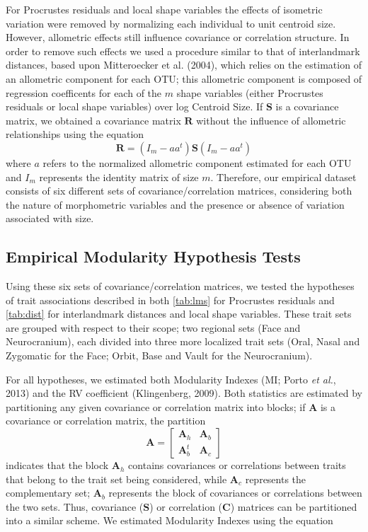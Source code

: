 \documentclass[12pt,twoside]{report}
\begin{document}
For Procrustes residuals and local shape variables the effects of
isometric variation were removed by normalizing each individual to unit
centroid size. However, allometric effects still influence covariance or
correlation structure. In order to remove such effects we used a
procedure similar to that of interlandmark distances, based upon
Mitteroecker et al. (2004), which relies on the estimation of an
allometric component for each OTU; this allometric component is composed
of regression coefficents for each of the $m$ shape variables (either
Procrustes residuals or local shape variables) over log Centroid Size.
If $\mathbf{S}$ is a covariance matrix, we obtained a covariance matrix
$\mathbf{R}$ without the influence of allometric relationships using the
equation \[
\mathbf{R} = (I_m - aa^t) \mathbf{S} (I_m - aa^t)
\] where $a$ refers to the normalized allometric component estimated for
each OTU and $I_m$ represents the identity matrix of size $m$.
Therefore, our empirical dataset consists of six different sets of
covariance/correlation matrices, considering both the nature of
morphometric variables and the presence or absence of variation
associated with size.

\subsection{Empirical Modularity Hypothesis
Tests}\label{empirical-modularity-hypothesis-tests}

Using these six sets of covariance/correlation matrices, we tested the
hypotheses of trait associations described in both \autoref{tab:lms} for
Procrustes residuals and \autoref{tab:dist} for interlandmark distances
and local shape variables. These trait sets are grouped with respect to
their scope; two regional sets (Face and Neurocranium), each divided
into three more localized trait sets (Oral, Nasal and Zygomatic for the
Face; Orbit, Base and Vault for the Neurocranium).

For all hypotheses, we estimated both Modularity Indexes (MI; Porto
\emph{et al.}, 2013) and the RV coefficient (Klingenberg, 2009). Both
statistics are estimated by partitioning any given covariance or
correlation matrix into blocks; if $\mathbf{A}$ is a covariance or
correlation matrix, the partition \[
\mathbf{A} =
\begin{bmatrix}
\mathbf{A}_h & \mathbf{A}_b \\
\mathbf{A}^t_b & \mathbf{A}_c
\end{bmatrix}
\] indicates that the block $\mathbf{A}_h$ contains covariances or
correlations between traits that belong to the trait set being
considered, while $\mathbf{A}_c$ represents the complementary set;
$\mathbf{A}_b$ represents the block of covariances or correlations
between the two sets. Thus, covariance ($\mathbf{S}$) or correlation
($\mathbf{C}$) matrices can be partitioned into a similar scheme. We
estimated Modularity Indexes using the equation
\end{document}
